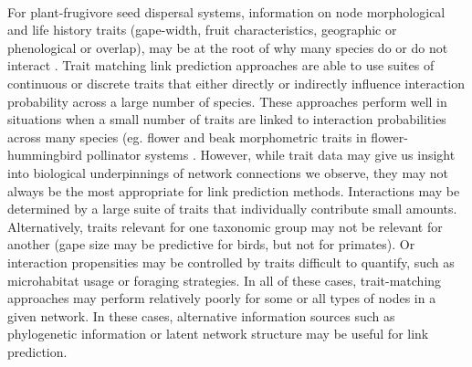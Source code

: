 \paragraph*{}
For plant-frugivore seed dispersal systems, information on node morphological and life history traits (gape-width, fruit characteristics, geographic or phenological or overlap), may be at the root of why many species do or do not interact \cite{bender2018morphological,gonzalez2015relative, moran2010can}. Trait matching link prediction approaches are able to use suites of continuous or discrete traits that either directly or indirectly influence interaction probability across a large number of species. These approaches perform well in situations when a small number of traits are linked to interaction probabilities across many species (eg. flower and beak morphometric traits in flower-hummingbird pollinator systems \cite{pichler2020}. However, while trait data may give us insight into biological underpinnings of network connections we observe, they may not always be the most appropriate for link prediction methods. Interactions may be determined by a large suite of traits that individually contribute small amounts. Alternatively, traits relevant for one taxonomic group may not be relevant for another (gape size may be predictive for birds, but not for primates). Or interaction propensities may be controlled by traits difficult to quantify, such as microhabitat usage or foraging strategies. In all of these cases, trait-matching approaches may perform relatively poorly for some or all types of nodes in a given network. In these cases, alternative information sources such as phylogenetic information or latent network structure may be useful for link prediction. 

